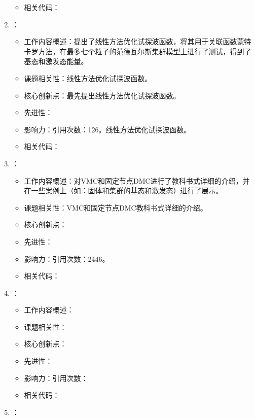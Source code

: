 \begin{enumerate}
\begin{itemize}
                \item 相关代码：
            \end{itemize}
        \item \citet{nightingale2001optimization}：
        \begin{itemize}
            \item 工作内容概述：提出了线性方法优化试探波函数，将其用于关联函数蒙特卡罗方法，在最多七个粒子的范德瓦尔斯集群模型上进行了测试，得到了基态和激发态能量。
            \item 课题相关性：线性方法优化试探波函数。
            \item 核心创新点：最先提出线性方法优化试探波函数。
            \item 先进性：
            \item 影响力：引用次数：126。线性方法优化试探波函数。
            \item 相关代码：
        \end{itemize}
        \item \citet{foulkes2001quantum}：
            \begin{itemize}
                \item 工作内容概述：对VMC和固定节点DMC进行了教科书式详细的介绍，并在一些案例上（如：固体和集群的基态和激发态）进行了展示。
                \item 课题相关性：VMC和固定节点DMC教科书式详细的介绍。
                \item 核心创新点：
                \item 先进性：
                \item 影响力：引用次数：2446。
                \item 相关代码：
            \end{itemize}
        \item \citet{santoro2002theory}：
            \begin{itemize}
                \item 工作内容概述：
                \item 课题相关性：
                \item 核心创新点：
                \item 先进性：
                \item 影响力：引用次数：
                \item 相关代码：
            \end{itemize}
        \item \citet{casula2005diffusion}：
            \begin{itemize}

\end{itemize}
\end{enumerate}
